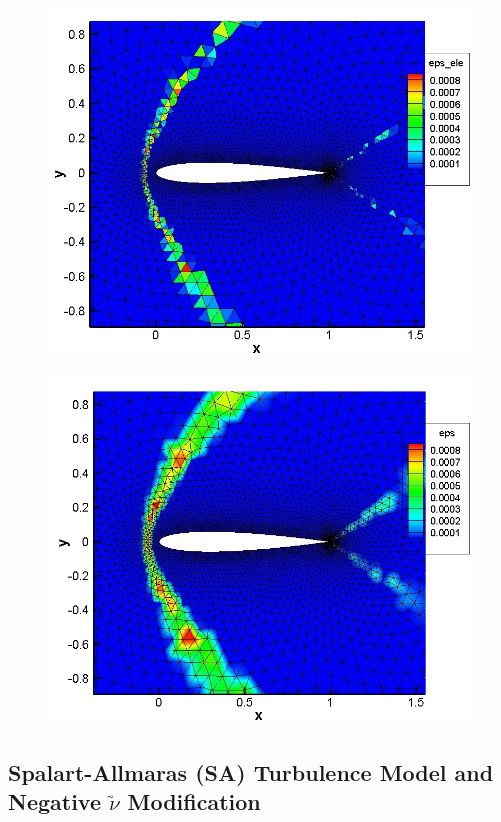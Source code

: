 \begin{figure}
\centering
\begin{minipage}[t]{.55\textwidth}
  \centering
  \includegraphics[width=.85\linewidth]{./figures/M1pt6-inv-av-ele-mesh}
  \label{fig:AV-ele}
\end{minipage}%
\begin{minipage}[t]{.55\textwidth}
  \centering
  \includegraphics[width=.85\linewidth]{./figures/M1pt6-inv-av-mesh}
  \label{fig:AV-cont}
\end{minipage}
\end{figure} 

\subsection{Spalart-Allmaras (SA) Turbulence Model and Negative $\tilde\nu$ Modification}\label{sec:sa_model}

